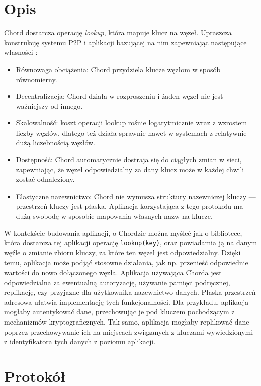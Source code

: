 \documentclass[12pt, twoside, openany]{report}
\begin{document}
\section{Opis}
Chord dostarcza operację \textit{lookup}, która mapuje klucz na węzeł. Upraszcza konstrukcję systemu P2P i aplikacji bazującej na nim zapewniając następujące własności \cite{bib:chord}:

\begin{itemize}
\item Równowaga obciążenia: Chord przydziela klucze węzłom w sposób równomierny.

\item Decentralizacja: Chord działa w rozproszeniu i żaden węzeł nie jest ważniejszy od innego.

\item Skalowalność: koszt operacji lookup rośnie logarytmicznie wraz z wzrostem liczby węzłów, dlatego też działa sprawnie nawet w systemach z relatywnie dużą liczebnością węzłów.

\item Dostępność: Chord automatycznie dostraja się do ciągłych zmian w sieci, zapewniając, że węzeł odpowiedzialny za dany klucz może w każdej chwili zostać odnaleziony.

\item Elastyczne nazewnictwo: Chord nie wymusza struktury nazewniczej kluczy --- przestrzeń kluczy jest płaska. Aplikacja korzystająca z tego protokołu ma dużą swobodę w sposobie mapowania własnych nazw na klucze.
\end{itemize}

W kontekście budowania aplikacji, o Chordzie można myśleć jak o bibliotece, która dostarcza tej aplikacji operację \texttt{lookup(key)}, oraz powiadamia ją na danym węźle o zmianie zbioru kluczy, za które ten węzeł jest odpowiedzialny. Dzięki temu, aplikacja może podjąć stosowne działania, jak np. przenieść odpowiednie wartości do nowo dołączonego węzła. Aplikacja używająca Chorda jest odpowiedzialna za ewentualną autoryzację, używanie pamięci podręcznej, replikację, czy przyjazne dla użytkownika nazewnictwo danych. Płaska przestrzeń
adresowa ułatwia implementację tych funkcjonalności. Dla przykładu, aplikacja mogłaby autentykować dane, przechowując je pod kluczem pochodzącym z mechanizmów kryptograficznych. Tak samo, aplikacja mogłaby replikować dane poprzez przechowywanie ich na miejscach związanych z kluczami wywiedzionymi z identyfikatora tych danych z poziomu aplikacji.


\section{Protokół}
\label{protokol_chord}
\end{document}
